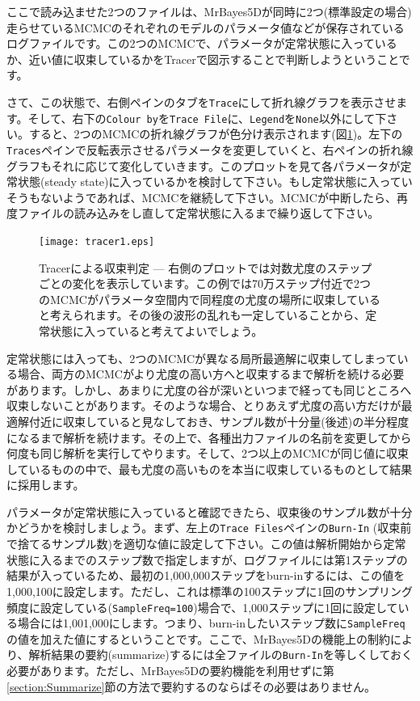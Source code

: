 \documentclass[titlepage,10pt,a4paper]{jsbook}
\begin{document}
ここで読み込ませた2つのファイルは、MrBayes5Dが同時に2つ(標準設定の場合)走らせているMCMCのそれぞれのモデルのパラメータ値などが保存されているログファイルです。この2つのMCMCで、パラメータが定常状態に入っているか、近い値に収束しているかをTracerで図示することで判断しようということです。

さて、この状態で、右側ペインのタブを\texttt{Trace}にして折れ線グラフを表示させます。そして、右下の\texttt{Colour by}を\texttt{Trace File}に、\texttt{Legend}を\texttt{None}以外にして下さい。すると、2つのMCMCの折れ線グラフが色分け表示されます(図\ref{figure:convergence})。左下の\texttt{Traces}ペインで反転表示させるパラメータを変更していくと、右ペインの折れ線グラフもそれに応じて変化していきます。このプロットを見て各パラメータが定常状態(steady state)に入っているかを検討して下さい。もし定常状態に入っていそうもないようであれば、MCMCを継続して下さい。MCMCが中断したら、再度ファイルの読み込みをし直して定常状態に入るまで繰り返して下さい。
\begin{figure}[h]
\begin{center}
\caption{Tracerによる収束判定 --- 右側のプロットでは対数尤度のステップごとの変化を表示しています。この例では70万ステップ付近で2つのMCMCがパラメータ空間内で同程度の尤度の場所に収束していると考えられます。その後の波形の乱れも一定していることから、定常状態に入っていると考えてよいでしょう。}\label{figure:convergence}
\texttt{[image: tracer1.eps]}
\end{center}
\end{figure}

定常状態には入っても、2つのMCMCが異なる局所最適解に収束してしまっている場合、両方のMCMCがより尤度の高い方へと収束するまで解析を続ける必要があります。しかし、あまりに尤度の谷が深いといつまで経っても同じところへ収束しないことがあります。そのような場合、とりあえず尤度の高い方だけが最適解付近に収束していると見なしておき、サンプル数が十分量(後述)の半分程度になるまで解析を続けます。その上で、各種出力ファイルの名前を変更してから何度も同じ解析を実行してやります。そして、2つ以上のMCMCが同じ値に収束しているものの中で、最も尤度の高いものを本当に収束しているものとして結果に採用します。

パラメータが定常状態に入っていると確認できたら、収束後のサンプル数が十分かどうかを検討しましょう。まず、左上の\texttt{Trace Files}ペインの\texttt{Burn-In} (収束前で捨てるサンプル数)を適切な値に設定して下さい。この値は解析開始から定常状態に入るまでのステップ数で指定しますが、ログファイルには第1ステップの結果が入っているため、最初の1,000,000ステップをburn-inするには、この値を1,000,100に設定します。ただし、これは標準の100ステップに1回のサンプリング頻度に設定している(\texttt{SampleFreq=100})場合で、1,000ステップに1回に設定している場合には1,001,000にします。つまり、burn-inしたいステップ数に\texttt{SampleFreq}の値を加えた値にするということです。ここで、MrBayes5Dの機能上の制約により、解析結果の要約(summarize)するには全ファイルの\texttt{Burn-In}を等しくしておく必要があります。ただし、MrBayes5Dの要約機能を利用せずに第\ref{section:Summarize}節の方法で要約するのならばその必要はありません。
\end{document}
